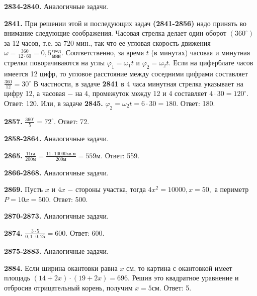 \textbf{2834-2840.} Аналогичные задачи.

\textbf{2841.} При решении этой и последующих задач \textbf{(2841-2856)} надо принять во внимание следующие соображения. Часовая стрелка делает один оборот $(360^\circ)$ за 12 часов, т.е. за 720 мин., так что  ее угловая скорость движения $\omega=\frac{360}{12\cdot60}=0,5\frac{\text{град}}{\text{мин}}.$ Соответственно, за время $t$ (в минутах) часовая и минутная стрелки поворачиваются на углы $\varphi_1=\omega_1t$ и $\varphi_2=\omega_2t$. Если на циферблате часов имеется 12 цифр, то угловое расстояние между соседними цифрами составляет $\frac{360}{12}=30^\circ$
В частности, в задаче \textbf{2841} в 4 часа минутная стрелка указывает на цифру 12, а часовая $-$ на 4, промежуток между 12 и 4 составляет $4\cdot30=120^\circ$. \newline \null \hspace*{\fill} Ответ: 120. \newline
Или, в задаче \textbf{2845.} $\varphi_2=\omega_2t=6\cdot30=180.$ \newline \null \hspace*{\fill} Ответ: 180. 

\textbf{2857.} $\frac{360^\circ}{5}=72^\circ.$ \newline \null \hspace*{\fill} Ответ: 72. 

\textbf{2858-2864.} Аналогичные задачи.

\textbf{2865.} $\frac{11\text{га}}{200\text{м}}=\frac{11\cdot10000\text{кв.м}}{200\text{м}}=559\text{м}$. \newline \null \hspace*{\fill} Ответ: 559. 

\textbf{2866-2868.} Аналогичные задачи.

\textbf{2869.} Пусть $x$ и $4x$ $-$ стороны участка, тогда $4x^2=10000, x=50,$ а периметр $P = 10x = 500.$ \newline \null \hspace*{\fill}Ответ: 500.

\textbf{2870-2873.} Аналогичные задачи.

\textbf{2874.} $\frac{3\cdot5}{0,1\cdot0,25}=600.$ \newline \null \hspace*{\fill} Ответ: 600. 

\textbf{2875-2883.} Аналогичные задачи.

\textbf{2884.} Если ширина окантовки равна $x$ см, то картина с окантовкой имеет площадь $(14+2x)\cdot(19+2x)=696.$ Решив это квадратное уравнение и отбросив отрицательный корень, получим $x=5\text{см}.$ \newline \null \hspace*{\fill} Ответ: 5. 

